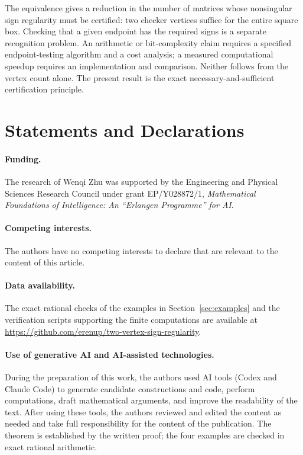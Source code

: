 \documentclass[10pt,a4paper]{article}
\theoremstyle{definition}
\theoremstyle{remark}
\numberwithin{equation}{section}
\begin{document}
The equivalence gives a reduction in the number of matrices
whose nonsingular sign regularity must be certified: two
checker vertices suffice for the entire square box. Checking
that a given endpoint has the required signs is a separate
recognition problem. An arithmetic or bit-complexity claim
requires a specified endpoint-testing algorithm and a cost
analysis; a measured computational speedup requires an
implementation and comparison. Neither follows from the
vertex count alone. The present result is the exact
necessary-and-sufficient certification principle.


\section*{Statements and Declarations}
\paragraph{Funding.}
The research of Wenqi Zhu was supported by the Engineering and Physical
Sciences Research Council under grant EP/Y028872/1, \emph{Mathematical
Foundations of Intelligence: An ``Erlangen Programme'' for AI}.

\paragraph{Competing interests.}
The authors have no competing interests to declare that are relevant to
the content of this article.

\paragraph{Data availability.}
The exact rational checks of the examples in Section~\ref{sec:examples}
and the verification scripts supporting the finite computations are
available at
\url{https://github.com/erenup/two-vertex-sign-regularity}.

\paragraph{Use of generative AI and AI-assisted technologies.}
During the preparation of this work, the authors used AI tools (Codex and Claude Code) to generate candidate constructions and code, perform computations, draft mathematical arguments, and improve the readability of the text. After using these
tools, the authors reviewed and edited the content as needed and take full
responsibility for the content of the publication. The theorem is
established by the written proof; the four examples are checked in exact
rational arithmetic.



\end{document}
